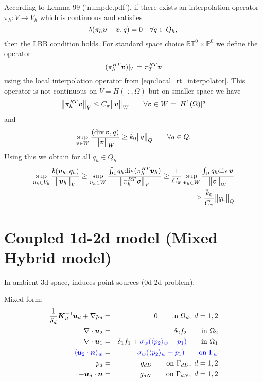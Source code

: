 According to Lemma 99 ('numpde.pdf'), if there exists an interpolation operator
$\pi_h: V\rightarrow V_h$ which is continuous and satisfies
\begin{equation}
    b(\pi_h\mathbf{\boldsymbol{v}}- \mathbf{\boldsymbol{v}}, q) = 0 \quad \forall q\in Q_h,\\ 
\end{equation}
then the LBB condition holds.
For standard space choice $\mathbb{RT}^0\times\mathbb{P}^0$ we define
the operator 
\begin{equation}
    (\pi^{RT}_h \mathbf{\boldsymbol{v}})|_T = \pi^{RT}_T \mathbf{\boldsymbol{v}}
\end{equation}
using the local interpolation operator from \eqref{eqn:local_rt_interpolator}.
This operator is not continuous on $V=H(\div,\Omega)$ but on
smaller space we have
\begin{equation}
    \bigl\Vert\pi^{RT}_h \mathbf{\boldsymbol{v}}\bigr\Vert_V \leq C_\pi \bigl\Vert\mathbf{\boldsymbol{v}}\bigr\Vert_W \qquad \forall \mathbf{\boldsymbol{v}}\in W=[H^1(\Omega)]^d
\end{equation}
and
\begin{equation}
    \sup_{\mathbf{\boldsymbol{v}}\in W} \frac{({\rm div}\,\mathbf{\boldsymbol{v}}, q)}{\bigl\Vert\mathbf{\boldsymbol{v}}\bigr\Vert_W} \geq \tilde{k}_0 \bigl\Vert q\bigr\Vert_Q \qquad \forall q\in Q.
\end{equation}
Using this we obtain for all $q_h\in Q_h$
\begin{align}
    \sup_{\mathbf{\boldsymbol{v}}_h\in V_h} \frac{b(\mathbf{\boldsymbol{v}}_h,q_h)}{\bigl\Vert\mathbf{\boldsymbol{v}}_h\bigr\Vert_V} \geq
    \sup_{\mathbf{\boldsymbol{v}}_h\in W} \frac{\int_{\Omega} q_h {\rm div} (\pi^{RT}_h \mathbf{\boldsymbol{v}}_h)}{\bigl\Vert\pi^{RT}_h \mathbf{\boldsymbol{v}}\bigr\Vert_V} \geq
    \frac{1}{C_\pi} \sup_{\mathbf{\boldsymbol{v}}_h\in W} \frac{\int_{\Omega} q_h {\rm div}\,\mathbf{\boldsymbol{v}}}{\bigl\Vert\mathbf{\boldsymbol{v}}\bigr\Vert_W}
    \nonumber\\ \geq \frac{\tilde{k}_0}{C_\pi}\bigl\Vert q_h\bigr\Vert_Q
\end{align}




\section{Coupled 1d-2d model (Mixed Hybrid model)}

In ambient 3d space, induces point sources (0d-2d problem).
  
  Mixed form:
  \begin{eqnarray}
\frac{1}{\delta_d} \mathbf{\boldsymbol{K}}_d^{-1}\mathbf{\boldsymbol{u}}_d + \nabla p_d &=& 0 \qquad \textrm{in } \Omega_d,\; d=1,2  \\
\nabla \cdot \mathbf{\boldsymbol{u}}_2 &=& \delta_2 f_2 \qquad \textrm{in } \Omega_2\\
\nabla \cdot \mathbf{\boldsymbol{u}}_1 &=& \delta_1 f_1 + {\color{blue}\sigma_w(\langle p_2\rangle_w-p_1)}\qquad \textrm{in } \Omega_1\\
\color{blue}\langle\mathbf{\boldsymbol{u}}_2 \cdot \mathbf{\boldsymbol{n}}\rangle_w &=& \color{blue}\sigma_w (\langle p_2\rangle_w - p_{1}) \qquad \textrm{on } \Gamma_w\\
p_d &=& g_{dD} \qquad \textrm{on } \Gamma_{dD},\; d=1,2 \\
-\mathbf{\boldsymbol{u}}_d \cdot \mathbf{\boldsymbol{n}} &=& g_{dN} \qquad \textrm{on } \Gamma_{dN},\; d=1,2
  \end{eqnarray}
  
